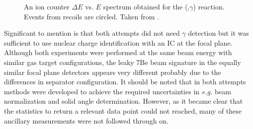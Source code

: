 \begin{figure}
\caption{An ion counter $\Delta{}E$ vs. $E$ spectrum obtained for the (,$\gamma$) reaction. Events from  recoils are circled. Taken from \cite{bard09}.}
\label{fig:bardayan09_fig4}
\end{figure}%
Significant to mention is that both attempts did not need $\gamma$ detection but it was sufficient to use nuclear charge identification with an IC at the focal plane. Although both experiments were performed at the same beam energy with similar gas target configurations, the leaky 7Be beam signature in the equally similar focal plane detectors appears very different probably due to the differences in separator configuration. It should be noted that in both attempts methods were developed to achieve the required uncertainties in {\it e.g.} beam normalization and solid angle determination. However, as it became clear that the statistics to return a relevant data point could not reached, many of these ancillary measurements were not followed through on. 


